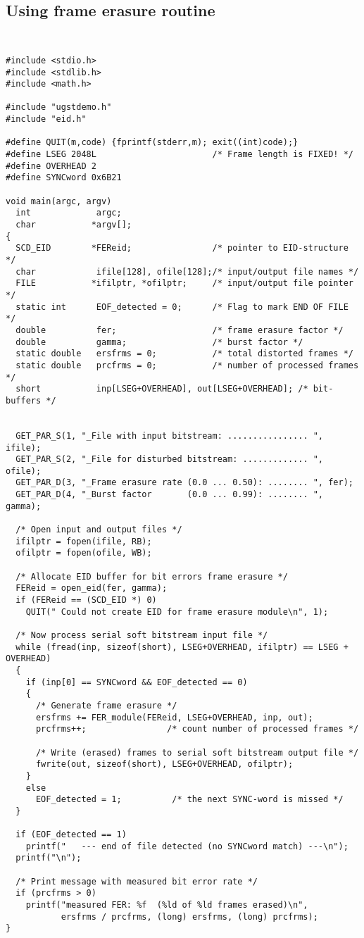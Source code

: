 \subsection {Using frame erasure routine}
{\tt\small
\begin{verbatim}
#include <stdio.h>
#include <stdlib.h>
#include <math.h>

#include "ugstdemo.h"
#include "eid.h"

#define QUIT(m,code) {fprintf(stderr,m); exit((int)code);}
#define LSEG 2048L                       /* Frame length is FIXED! */
#define OVERHEAD 2
#define SYNCword 0x6B21

void main(argc, argv)
  int             argc;
  char           *argv[];
{
  SCD_EID        *FEReid;                /* pointer to EID-structure */
  char            ifile[128], ofile[128];/* input/output file names */
  FILE           *ifilptr, *ofilptr;     /* input/output file pointer */
  static int      EOF_detected = 0;      /* Flag to mark END OF FILE */
  double          fer;                   /* frame erasure factor */
  double          gamma;                 /* burst factor */
  static double   ersfrms = 0;           /* total distorted frames */
  static double   prcfrms = 0;           /* number of processed frames */
  short           inp[LSEG+OVERHEAD], out[LSEG+OVERHEAD]; /* bit-buffers */


  GET_PAR_S(1, "_File with input bitstream: ................ ", ifile);
  GET_PAR_S(2, "_File for disturbed bitstream: ............. ", ofile);
  GET_PAR_D(3, "_Frame erasure rate (0.0 ... 0.50): ........ ", fer);
  GET_PAR_D(4, "_Burst factor       (0.0 ... 0.99): ........ ", gamma);

  /* Open input and output files */
  ifilptr = fopen(ifile, RB);
  ofilptr = fopen(ofile, WB);

  /* Allocate EID buffer for bit errors frame erasure */
  FEReid = open_eid(fer, gamma);
  if (FEReid == (SCD_EID *) 0)
    QUIT(" Could not create EID for frame erasure module\n", 1);

  /* Now process serial soft bitstream input file */
  while (fread(inp, sizeof(short), LSEG+OVERHEAD, ifilptr) == LSEG + OVERHEAD)
  {
    if (inp[0] == SYNCword && EOF_detected == 0)
    {
      /* Generate frame erasure */
      ersfrms += FER_module(FEReid, LSEG+OVERHEAD, inp, out);
      prcfrms++;                /* count number of processed frames */

      /* Write (erased) frames to serial soft bitstream output file */
      fwrite(out, sizeof(short), LSEG+OVERHEAD, ofilptr);
    }
    else
      EOF_detected = 1;          /* the next SYNC-word is missed */
  }

  if (EOF_detected == 1)
    printf("   --- end of file detected (no SYNCword match) ---\n");
  printf("\n");

  /* Print message with measured bit error rate */
  if (prcfrms > 0)
    printf("measured FER: %f  (%ld of %ld frames erased)\n",
           ersfrms / prcfrms, (long) ersfrms, (long) prcfrms);
}
\end{verbatim}
}

